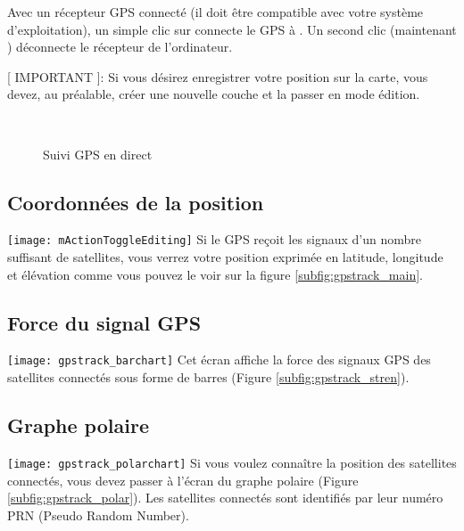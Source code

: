 Avec un récepteur GPS connecté (il doit être compatible avec votre système d'exploitation), un simple clic sur  connecte le GPS à \qg. Un second clic (maintenant ) déconnecte le récepteur de l'ordinateur.
 
[ IMPORTANT ]: Si vous désirez enregistrer votre position sur la carte, vous devez, au préalable, créer une nouvelle couche et la passer en mode édition.

\begin{figure}[ht]
\centering
     \hspace{0.33cm}
     \hspace{0.33cm}
    \\
\caption{Suivi GPS en direct \nixcaption} \label{fig:gpstrack_live}
\end{figure}

\subsection{Coordonnées de la position}
\texttt{[image: mActionToggleEditing]} Si le GPS reçoit les signaux d'un nombre suffisant de satellites, vous verrez votre position exprimée en latitude, longitude et élévation comme vous pouvez le voir sur la figure \ref{subfig:gpstrack_main}.

\subsection{Force du signal GPS}
\texttt{[image: gpstrack\_barchart]} Cet écran affiche la force des signaux GPS des satellites connectés sous forme de barres (Figure \ref{subfig:gpstrack_stren}).

\subsection{Graphe polaire}
\texttt{[image: gpstrack\_polarchart]} Si vous voulez connaître la position des satellites connectés, vous devez passer à l'écran du graphe polaire (Figure \ref{subfig:gpstrack_polar}).
Les satellites connectés sont identifiés par leur numéro PRN (Pseudo Random Number).

